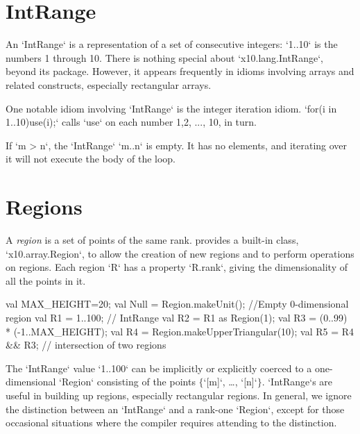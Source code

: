 \section{IntRange}
\label{sect:intrange}

An \xcd`IntRange` is a representation of a set of consecutive integers: 
\xcd`1..10` is the numbers 1 through 10.  There is nothing special about
\xcd`x10.lang.IntRange`, beyond its package.  However, it appears frequently
in idioms involving arrays and related constructs, especially rectangular
arrays.

One notable idiom involving \xcd`IntRange` is the integer iteration idiom.  
\xcd`for(i in 1..10)use(i);` calls 
\xcd`use` on each number 1,2, ..., 10, in turn.

If \xcd`m > n`, the \xcd`IntRange` \xcd`m..n` is empty.  It has no elements,
and iterating over it will not execute the body of the loop.

\section{Regions}\label{XtenRegions}

A {\em region} is a set of points of the same rank.  {}\Xten{}
provides a built-in class, \xcd`x10.array.Region`, to allow the
creation of new regions and to perform operations on regions. 
Each region \xcd`R` has a property \xcd`R.rank`, giving the dimensionality of
all the points in it.

\begin{ex}
\begin{xten}
val MAX_HEIGHT=20;
val Null = Region.makeUnit(); //Empty 0-dimensional region
val R1 = 1..100; // IntRange 
val R2 = R1 as Region(1);
val R3 = (0..99) * (-1..MAX_HEIGHT);
val R4 = Region.makeUpperTriangular(10);
val R5 = R4 && R3; // intersection of two regions
\end{xten}

The \xcd`IntRange` value \xcd`1..100` can be implicitly or explicitly coerced
to a one-dimensional \xcd`Region` consisting of the points
$\{$\xcdmath`[m]`, \dots, \xcdmath`[n]`$\}$.  \xcd`IntRange`s are useful in
building up regions, especially rectangular regions.  
In general, we ignore the distinction between an \xcd`IntRange` and a rank-one
\xcd`Region`, except for those occasional situations where the compiler
requires attending to the distinction.
\end{ex}

